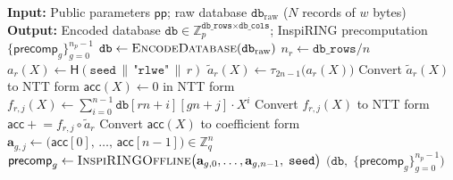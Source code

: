 \documentclass[11pt,a4paper]{article}
\newcommand{\Z}{\mathbb{Z}}
\begin{document}
\begin{algorithm}[H]
\caption{$\textsc{Preprocess}(\mathsf{pp},\; \texttt{db}_{\mathrm{raw}})$}
\label{alg:preprocess}
\begin{algorithmic}[1]
\State \textbf{Input:} Public parameters $\mathsf{pp}$; raw database $\texttt{db}_{\mathrm{raw}}$ ($N$ records of $w$ bytes)
\State \textbf{Output:} Encoded database $\texttt{db} \in \Z_p^{\texttt{db\_rows} \times \texttt{db\_cols}}$; InspiRING precomputation $\{\mathsf{precomp}_g\}_{g = 0}^{n_p - 1}$
\Statex
\State {}
\State $\texttt{db} \gets \textsc{EncodeDatabase}(\texttt{db}_{\mathrm{raw}})$ 
\Statex
\State {}
\State $n_r \gets \texttt{db\_rows} / n$
    \State $a_r(X) \gets \mathsf{H}(\texttt{seed} \,\|\, \texttt{"rlwe"} \,\|\, r)$ 
    \State $\tilde{a}_r(X) \gets \tau_{2n-1}\bigl(a_r(X)\bigr)$ 
    \State Convert $\tilde{a}_r(X)$ to NTT form
\EndFor
\Statex
\State {}
     
        \State $\mathsf{acc}(X) \gets 0$ in NTT form
            \State $f_{r,j}(X) \gets \sum_{i=0}^{n-1} \texttt{db}[r n + i][g n + j] \cdot X^i$ 
            \State Convert $f_{r,j}(X)$ to NTT form
            \State $\mathsf{acc} \mathrel{+}= f_{r,j} \circ \tilde{a}_r$ 
        \EndFor
        \State Convert $\mathsf{acc}(X)$ to coefficient form
        \State $\mathbf{a}_{g,j} \gets \bigl(\mathsf{acc}[0],\,\ldots,\,\mathsf{acc}[n-1]\bigr) \in \Z_q^n$ 
    \EndFor
\EndFor
\Statex
\State {}
    \State $\mathsf{precomp}_g \gets \textsc{InspiRINGOffline}\bigl(\mathbf{a}_{g,0}, \ldots, \mathbf{a}_{g,n-1},\; \texttt{seed}\bigr)$ 
\EndFor
\State \Return $\bigl(\texttt{db},\; \{\mathsf{precomp}_g\}_{g=0}^{n_p - 1}\bigr)$
\end{algorithmic}
\end{algorithm}
\end{document}
